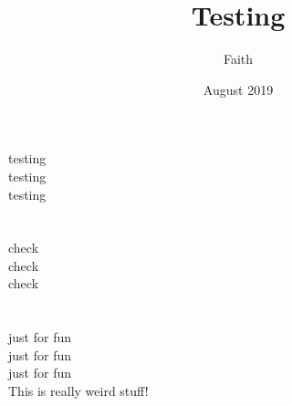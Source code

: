 \documentclass{article}
\title{Testing}
\date{August 2019}
\author{Faith}
\begin{document}
\maketitle
testing \\
testing\\
testing\\
\\
\\
check\\
check\\
check\\
\\
\\
just for fun
\\
just for fun
\\
just for fun
\\

This is really weird stuff!
\end{document}
